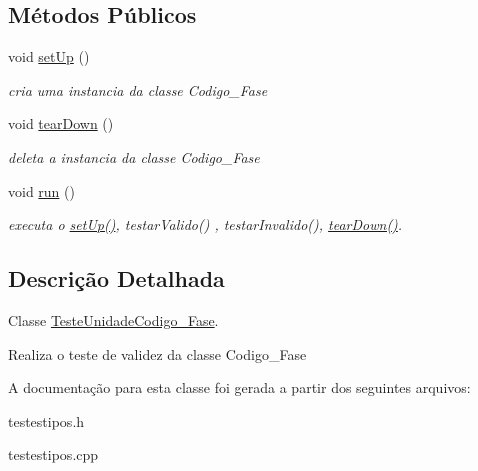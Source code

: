 \subsection*{\-Métodos \-Públicos}
\begin{DoxyCompactItemize}
\item 
\hypertarget{class_teste_unidade_codigo___fase_a7c3ee4cd4096b53c8640659f098e2053}{
void \hyperlink{class_teste_unidade_codigo___fase_a7c3ee4cd4096b53c8640659f098e2053}{set\-Up} ()}
\label{class_teste_unidade_codigo___fase_a7c3ee4cd4096b53c8640659f098e2053}

\begin{DoxyCompactList}\small\item\em cria uma instancia da classe \-Codigo\-\_\-\-Fase \end{DoxyCompactList}\item 
\hypertarget{class_teste_unidade_codigo___fase_acea7843e220309aab2ef6baf014a15dd}{
void \hyperlink{class_teste_unidade_codigo___fase_acea7843e220309aab2ef6baf014a15dd}{tear\-Down} ()}
\label{class_teste_unidade_codigo___fase_acea7843e220309aab2ef6baf014a15dd}

\begin{DoxyCompactList}\small\item\em deleta a instancia da classe \-Codigo\-\_\-\-Fase \end{DoxyCompactList}\item 
\hypertarget{class_teste_unidade_codigo___fase_a4d4bb33015750352e358c34312e9b55f}{
void \hyperlink{class_teste_unidade_codigo___fase_a4d4bb33015750352e358c34312e9b55f}{run} ()}
\label{class_teste_unidade_codigo___fase_a4d4bb33015750352e358c34312e9b55f}

\begin{DoxyCompactList}\small\item\em executa o \hyperlink{class_teste_unidade_codigo___fase_a7c3ee4cd4096b53c8640659f098e2053}{set\-Up()}, testar\-Valido() , testar\-Invalido(), \hyperlink{class_teste_unidade_codigo___fase_acea7843e220309aab2ef6baf014a15dd}{tear\-Down()}. \end{DoxyCompactList}\end{DoxyCompactItemize}


\subsection{\-Descrição \-Detalhada}
\-Classe \hyperlink{class_teste_unidade_codigo___fase}{\-Teste\-Unidade\-Codigo\-\_\-\-Fase}. 

\-Realiza o teste de validez da classe \-Codigo\-\_\-\-Fase 

\-A documentação para esta classe foi gerada a partir dos seguintes arquivos\-:\begin{DoxyCompactItemize}
\item 
testestipos.\-h\item 
testestipos.\-cpp\end{DoxyCompactItemize}
